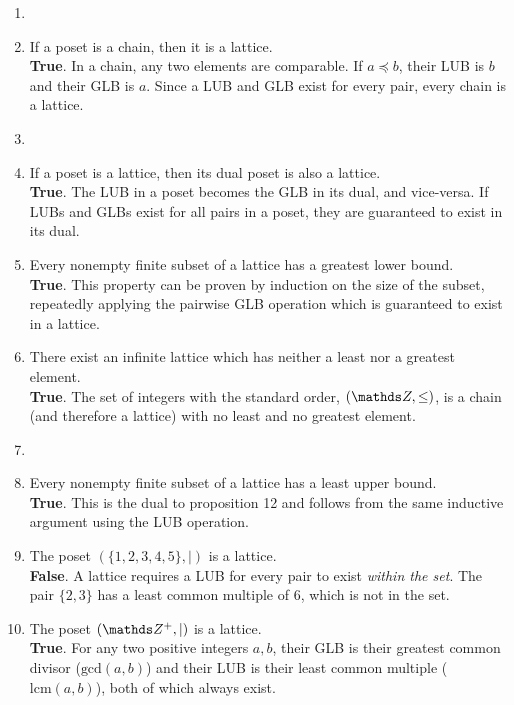 \documentclass[10pt]{article}
\theoremstyle{definition}
\theoremstyle{plain}
\numberwithin{equation}{section}
\begin{document}
\begin{enumerate}
  \item


  \item If a poset is a chain, then it is a lattice. \\
  \textbf{True}. In a chain, any two elements are comparable. If $a \preceq b$, their LUB is $b$ and their GLB is $a$. Since a LUB and GLB exist for every pair, every chain is a lattice.
  


  \item

  \item If a poset is a lattice, then its dual poset is also a lattice. \\
  \textbf{True}. The LUB in a poset becomes the GLB in its dual, and vice-versa. If LUBs and GLBs exist for all pairs in a poset, they are guaranteed to exist in its dual.

  \item Every nonempty finite subset of a lattice has a greatest lower bound. \\
  \textbf{True}. This property can be proven by induction on the size of the subset, repeatedly applying the pairwise GLB operation which is guaranteed to exist in a lattice.

  \item There exist an infinite lattice which has neither a least nor a greatest element. \\
  \textbf{True}. The set of integers with the standard order, $(\setZ, \leq)$, is a chain (and therefore a lattice) with no least and no greatest element.





  \item



  \item Every nonempty finite subset of a lattice has a least upper bound. \\
  \textbf{True}. This is the dual to proposition 12 and follows from the same inductive argument using the LUB operation.

  \item The poset $(\{1,2,3,4,5\}, \mid)$ is a lattice. \\
  \textbf{False}. A lattice requires a LUB for every pair to exist \emph{within the set}. The pair $\{2, 3\}$ has a least common multiple of 6, which is not in the set.
  
  \item The poset $(\setZ^{+}, \mid)$ is a lattice. \\
  \textbf{True}. For any two positive integers $a, b$, their GLB is their greatest common divisor ($\text{gcd}(a,b)$) and their LUB is their least common multiple ($\text{lcm}(a,b)$), both of which always exist.


\end{enumerate}
\end{document}
